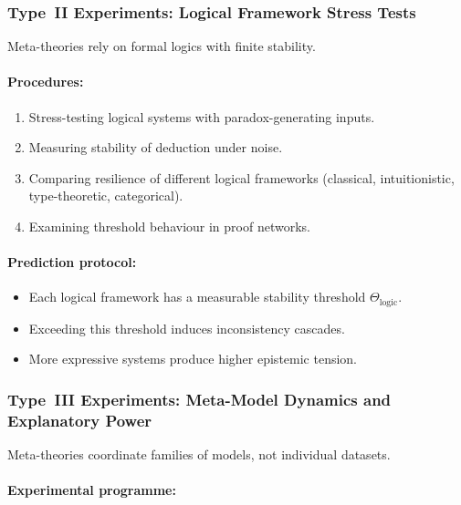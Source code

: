 \subsubsection{Type~II Experiments: Logical Framework Stress Tests}

Meta-theories rely on formal logics with finite stability.

\paragraph{Procedures:}

\begin{enumerate}
    \item Stress-testing logical systems with paradox-generating inputs.
    \item Measuring stability of deduction under noise.
    \item Comparing resilience of different logical frameworks
          (classical, intuitionistic, type-theoretic, categorical).
    \item Examining threshold behaviour in proof networks.
\end{enumerate}

\paragraph{Prediction protocol:}

\begin{itemize}
    \item Each logical framework has a measurable stability threshold
          $\Theta_{\mathrm{logic}}$.
    \item Exceeding this threshold induces inconsistency cascades.
    \item More expressive systems produce higher epistemic tension.
\end{itemize}



\subsubsection{Type~III Experiments: Meta-Model Dynamics and Explanatory Power}

Meta-theories coordinate families of models, not individual datasets.

\paragraph{Experimental programme:}

